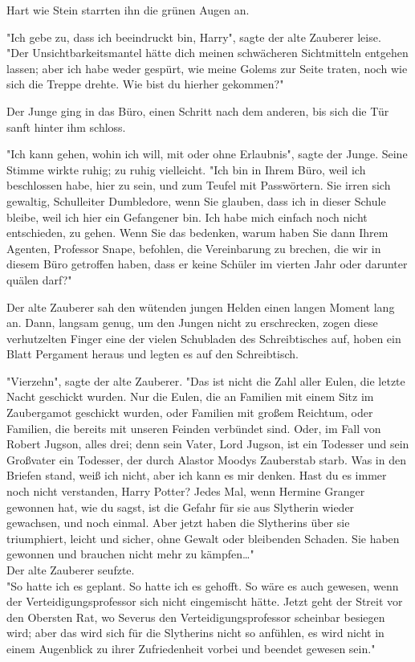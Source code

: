 {Hart wie Stein starrten ihn die grünen Augen an.

"Ich gebe zu, dass ich beeindruckt bin, Harry", sagte der alte Zauberer leise.\\ "Der Unsichtbarkeitsmantel hätte dich meinen schwächeren Sichtmitteln entgehen lassen; aber ich habe weder gespürt, wie meine Golems zur Seite traten, noch wie sich die Treppe drehte. Wie bist du hierher gekommen?"

Der Junge ging in das Büro, einen Schritt nach dem anderen, bis sich die Tür sanft hinter ihm schloss.

"Ich kann gehen, wohin ich will, mit oder ohne Erlaubnis", sagte der Junge. Seine Stimme wirkte ruhig; zu ruhig vielleicht. "Ich bin in Ihrem Büro, weil ich beschlossen habe, hier zu sein, und zum Teufel mit Passwörtern. Sie irren sich gewaltig, Schulleiter Dumbledore, wenn Sie glauben, dass ich in dieser Schule bleibe, weil ich hier ein Gefangener bin. Ich habe mich einfach noch nicht entschieden, zu gehen. Wenn Sie das bedenken, warum haben Sie dann Ihrem Agenten, Professor Snape, befohlen, die Vereinbarung zu brechen, die wir in diesem Büro getroffen haben, dass er keine Schüler im vierten Jahr oder darunter quälen darf?"

Der alte Zauberer sah den wütenden jungen Helden einen langen Moment lang an. Dann, langsam genug, um den Jungen nicht zu erschrecken, zogen diese verhutzelten Finger eine der vielen Schubladen des Schreibtisches auf, hoben ein Blatt Pergament heraus und legten es auf den Schreibtisch.

"Vierzehn", sagte der alte Zauberer. "Das ist nicht die Zahl aller Eulen, die letzte Nacht geschickt wurden. Nur die Eulen, die an Familien mit einem Sitz im Zaubergamot geschickt wurden, oder Familien mit großem Reichtum, oder Familien, die bereits mit unseren Feinden verbündet sind. Oder, im Fall von Robert Jugson, alles drei; denn sein Vater, Lord Jugson, ist ein Todesser und sein Großvater ein Todesser, der durch Alastor Moodys Zauberstab starb. Was in den Briefen stand, weiß ich nicht, aber ich kann es mir denken. Hast du es immer noch nicht verstanden, Harry Potter? Jedes Mal, wenn Hermine Granger gewonnen hat, wie du sagst, ist die Gefahr für sie aus Slytherin wieder gewachsen, und noch einmal. Aber jetzt haben die Slytherins über sie triumphiert, leicht und sicher, ohne Gewalt oder bleibenden Schaden. Sie haben gewonnen und brauchen nicht mehr zu kämpfen…"\\ Der alte Zauberer seufzte.\\ "So hatte ich es geplant. So hatte ich es gehofft. So wäre es auch gewesen, wenn der Verteidigungsprofessor sich nicht eingemischt hätte. Jetzt geht der Streit vor den Obersten Rat, wo Severus den Verteidigungsprofessor scheinbar besiegen wird; aber das wird sich für die Slytherins nicht so anfühlen, es wird nicht in einem Augenblick zu ihrer Zufriedenheit vorbei und beendet gewesen sein."

}
